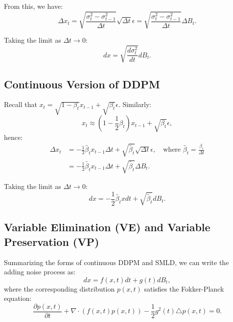 From this, we have:
\begin{equation}
\Delta x_t = \sqrt{\frac{\sigma_t^2-\sigma_{t-1}^2}{\Delta t}}\sqrt{\Delta t}\epsilon = \sqrt{\frac{\sigma_t^2-\sigma_{t-1}^2}{\Delta t}}\Delta B_t.
\end{equation}

Taking the limit as $\Delta t \to 0$:
\begin{equation}
dx = \sqrt{\frac{d\sigma_t^2}{dt}}dB_t.
\end{equation}

\subsection{Continuous Version of DDPM}

Recall that $x_t = \sqrt{1-\beta_t}x_{t-1} + \sqrt{\beta_t}\epsilon$. Similarly:
\begin{equation}
x_t \approx (1-\frac{1}{2}\beta_t)x_{t-1} + \sqrt{\beta_t}\epsilon,
\end{equation}
hence:
\begin{align}
\Delta x_t &= -\frac{1}{2}\tilde{\beta_t} x_{t-1}\Delta t + \sqrt{\tilde{\beta_t}}\sqrt{\Delta t}\epsilon, \quad \text{where } \tilde{\beta_t} = \frac{\beta_i}{\Delta t}\\
&= -\frac{1}{2}\tilde{\beta_t} x_{t-1}\Delta t + \sqrt{\tilde{\beta_t}}\Delta B_t.
\end{align}

Taking the limit as $\Delta t \to 0$:
\begin{equation}
dx = -\frac{1}{2}\tilde{\beta_t} x dt + \sqrt{\tilde{\beta_t}}dB_t.
\end{equation}

\subsection{Variable Elimination (VE) and Variable Preservation (VP)}

Summarizing the forms of continuous DDPM and SMLD, we can write the adding noise process as:
\begin{equation}
dx = f(x, t)dt + g(t) dB_t,
\end{equation}
where the corresponding distribution $p(x, t)$ satisfies the Fokker-Planck equation:
\begin{equation}
\frac{\partial p(x,t)}{\partial t} + \nabla \cdot (f(x,t) p(x,t)) - \frac{1}{2}g^2(t) \triangle p(x,t) = 0.
\end{equation}

